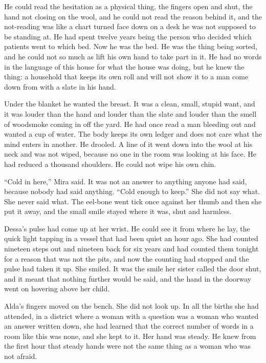 He could read the hesitation as a physical thing, the fingers open and shut, the hand not closing on the wool, and he could not read the reason behind it, and the not-reading was like a chart turned face down on a desk he was not supposed to be standing at. He had spent twelve years being the person who decided which patients went to which bed. Now he was the bed. He was the thing being sorted, and he could not so much as lift his own hand to take part in it. He had no words in the language of this house for what the house was doing, but he knew the thing: a household that keeps its own roll and will not show it to a man come down from  with a slate in his hand.

Under the blanket he wanted the breast. It was a clean, small, stupid want, and it was louder than the hand and louder than the slate and louder than the smell of woodsmoke coming in off the yard. He had once read a man bleeding out and wanted a cup of water. The body keeps its own ledger and does not care what the mind enters in another. He drooled. A line of it went down into the wool at his neck and was not wiped, because no one in the room was looking at his face. He had reduced a thousand shoulders. He could not wipe his own chin.

“Cold in here,” Mira said. It was not an answer to anything anyone had said, because nobody had said anything. “Cold enough to keep.” She did not say what. She never said what. The eel-bone went tick once against her thumb and then she put it away, and the small smile stayed where it was, shut and harmless.

Dessa's pulse had come up at her wrist. He could see it from where he lay, the quick light tapping in a vessel that had been quiet an hour ago. She had counted nineteen steps out and nineteen back for six years and had counted them tonight for a reason that was not the pits, and now the counting had stopped and the pulse had taken it up. She smiled. It was the smile her sister called the door shut, and it meant that nothing further would be said, and the hand in the doorway went on hovering above her child.

Alda's fingers moved on the bench. She did not look up. In all the births she had attended, in a district where a woman with a question was a woman who wanted an answer written down, she had learned that the correct number of words in a room like this was none, and she kept to it. Her hand was steady. He knew from the first hour that steady hands were not the same thing as a woman who was not afraid.

